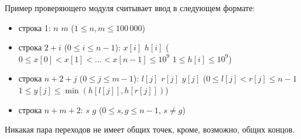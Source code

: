 Пример проверяющего модуля считывает ввод в следующем формате:
\begin{itemize}
\item строка 1:  $n$ $m$ ($1 \leq n, m \leq  100\,000$)
\item строка $2 + i$ ($0 \leq i \leq n - 1$):  $x[i]$ $h[i]$ ($0 \leq x[0] < x[1] < \ldots < x[n - 1] \leq 10^9$ $1 \leq h[i] \leq 10^9$)
\item строка $n + 2 + j$ ($0 \leq j \leq m - 1$):  $l[j]$ $r[j]$ $y[j]$ ($0 \leq l[j] < r[j] \leq n-1$ $1 \leq y[j] \leq \min(h[l[j]], h[r[j]])$)
\item строка $n + m + 2$: $s$ $g$ ($0 \leq s, g \leq  n - 1$, $s \neq g$)
\end{itemize}

Никакая пара переходов не имеет общих точек, кроме, возможно, общих
концов.